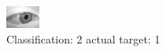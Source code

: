 \begin{figure}[h!]
\begin{center}
\includegraphics[width=0.60\columnwidth]{figures/ID2721_class_2_target_1.png}
\end{center}
\caption{ Classification: 2 actual target: 1}
\label{fig:ID2721_class_2_target_1}
\end{figure}
